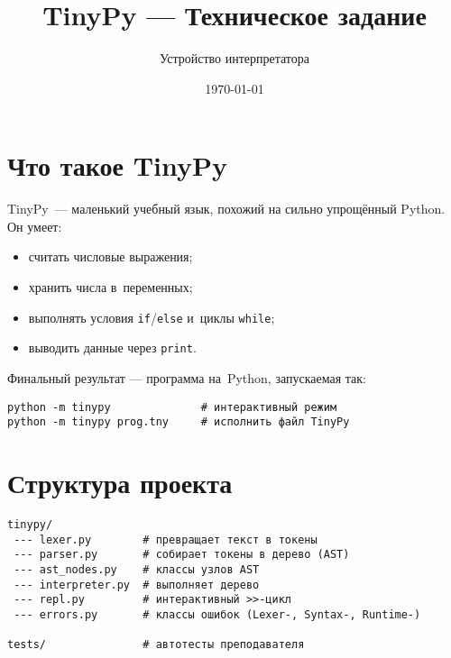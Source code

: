 \documentclass[12pt]{article}
\title{TinyPy — Техническое задание}
\author{Устройство интерпретатора}
\date{\today}
\begin{document}
\maketitle
\tableofcontents
\newpage

\section{Что такое TinyPy}
TinyPy — маленький учебный язык, похожий на сильно упрощённый Python. Он умеет:
\begin{itemize}
	\item считать числовые выражения;
	\item хранить числа в переменных;
	\item выполнять условия \texttt{if}/\texttt{else} и циклы \texttt{while};
	\item выводить данные через \texttt{print}.
\end{itemize}
Финальный результат — программа на~Python, запускаемая так:
\begin{verbatim}
python -m tinypy              # интерактивный режим
python -m tinypy prog.tny     # исполнить файл TinyPy
\end{verbatim}

\section{Структура проекта}
\begin{verbatim}
tinypy/
 --- lexer.py        # превращает текст в токены
 --- parser.py       # собирает токены в дерево (AST)
 --- ast_nodes.py    # классы узлов AST
 --- interpreter.py  # выполняет дерево
 --- repl.py         # интерактивный >>-цикл
 --- errors.py       # классы ошибок (Lexer-, Syntax-, Runtime-)

tests/               # автотесты преподавателя
\end{verbatim}

\end{document}
